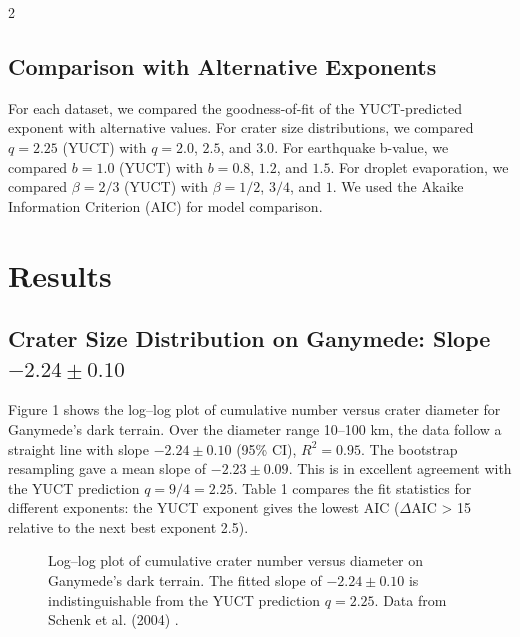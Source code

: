 \documentclass[11pt,a4paper]{article}
\begin{document}
\begin{multicols}{2}
		\subsection{Comparison with Alternative Exponents}
		
		For each dataset, we compared the goodness-of-fit of the YUCT-predicted exponent with alternative values. For crater size distributions, we compared \(q = 2.25\) (YUCT) with \(q = 2.0\), \(2.5\), and \(3.0\). For earthquake b-value, we compared \(b = 1.0\) (YUCT) with \(b = 0.8\), \(1.2\), and \(1.5\). For droplet evaporation, we compared \(\beta = 2/3\) (YUCT) with \(\beta = 1/2\), \(3/4\), and \(1\). We used the Akaike Information Criterion (AIC) for model comparison.
		
		\section{Results}
		
		\subsection{Crater Size Distribution on Ganymede: Slope \(-2.24 \pm 0.10\)}
		
		Figure 1 shows the log–log plot of cumulative number versus crater diameter for Ganymede’s dark terrain. Over the diameter range 10–100 km, the data follow a straight line with slope \(-2.24 \pm 0.10\) (95\% CI), \(R^2 = 0.95\). The bootstrap resampling gave a mean slope of \(-2.23 \pm 0.09\). This is in excellent agreement with the YUCT prediction \(q = 9/4 = 2.25\). Table 1 compares the fit statistics for different exponents: the YUCT exponent gives the lowest AIC (\(\Delta\)AIC > 15 relative to the next best exponent 2.5).
		
		\begin{figure}[htbp]
			\centering
			\caption{Log–log plot of cumulative crater number versus diameter on Ganymede’s dark terrain. The fitted slope of \(-2.24 \pm 0.10\) is indistinguishable from the YUCT prediction \(q = 2.25\). Data from Schenk et al. (2004) \cite{Schenk2004}.}
			\label{fig:craters}
		\end{figure}
		

\end{multicols}
\end{document}
